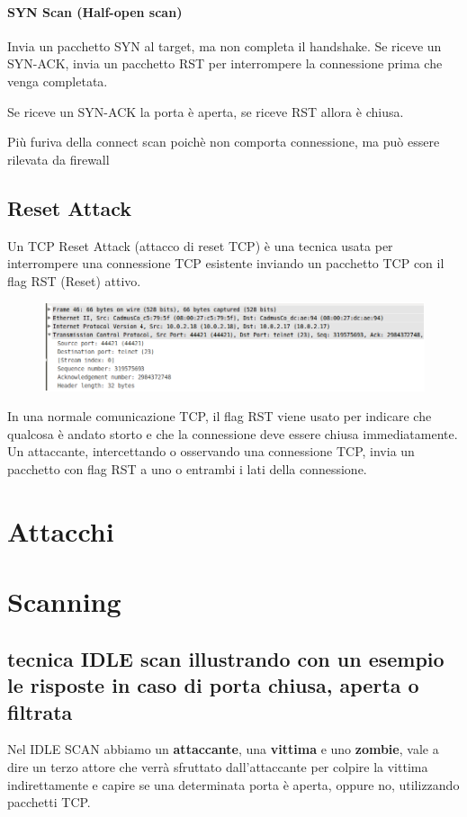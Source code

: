 \documentclass{report}
\begin{document}
\subsubsection{SYN Scan (Half-open scan)}
Invia un pacchetto SYN al target, ma non completa il handshake. Se riceve un SYN-ACK, invia un pacchetto RST per interrompere la connessione prima che venga completata.

\noindent Se riceve un SYN-ACK la porta è aperta, se riceve RST allora è chiusa.

\noindent Più furiva della connect scan poichè non comporta connessione, ma può essere rilevata da firewall 


\section{Reset Attack}
Un TCP Reset Attack (attacco di reset TCP) è una tecnica usata per interrompere una connessione TCP esistente inviando un pacchetto TCP con il flag RST (Reset) attivo.
\begin{figure}[H]
    \centering
    \includegraphics[width=1\linewidth]{images/reset.png}
\end{figure}
\noindent In una normale comunicazione TCP, il flag RST viene usato per indicare che qualcosa è andato storto e che la connessione deve essere chiusa immediatamente.
Un attaccante, intercettando o osservando una connessione TCP, invia un pacchetto con flag RST a uno o entrambi i lati della connessione.




\chapter{Attacchi}




\chapter{Scanning}
\section{tecnica IDLE scan illustrando con un esempio le risposte in caso di porta chiusa, aperta o filtrata}
Nel IDLE SCAN abbiamo un \textbf{attaccante}, una \textbf{vittima} e uno \textbf{zombie}, vale a dire un terzo attore che verrà sfruttato dall'attaccante per colpire la vittima indirettamente
e capire se una determinata porta è aperta, oppure no, utilizzando pacchetti TCP.
\end{document}
